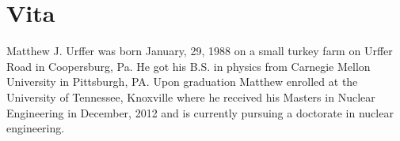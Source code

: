 \chapter*{Vita} \label{ch:vita}
Matthew J. Urffer was born January, 29, 1988 on a small turkey farm on Urffer Road in Coopersburg, Pa.
He got his B.S. in physics from Carnegie Mellon University in Pittsburgh, PA. 
Upon graduation Matthew enrolled at the University of Tennessee, Knoxville where he received his Masters in Nuclear Engineering in December, 2012 and is currently pursuing a doctorate in nuclear engineering.
